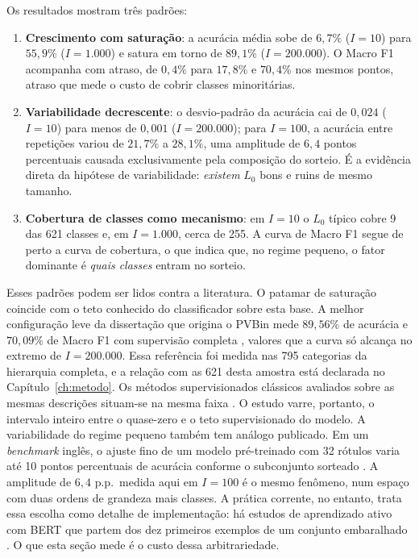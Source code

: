 Os resultados mostram três padrões:

\begin{enumerate}
  \item \textbf{Crescimento com saturação}: a acurácia média sobe de $6{,}7\%$
  ($I=10$) para $55{,}9\%$ ($I=1.000$) e satura em torno de $89{,}1\%$
  ($I=200.000$). O Macro F1 acompanha com atraso, de $0{,}4\%$ para $17{,}8\%$
  e $70{,}4\%$ nos mesmos pontos, atraso que mede o custo de cobrir classes
  minoritárias.
  \item \textbf{Variabilidade decrescente}: o desvio-padrão da acurácia cai de
  $0{,}024$ ($I=10$) para menos de $0{,}001$ ($I=200.000$); para $I=100$, a
  acurácia entre repetições variou de $21{,}7\%$ a $28{,}1\%$, uma amplitude
  de $6{,}4$ pontos percentuais causada exclusivamente pela composição do
  sorteio. É a evidência direta da hipótese de variabilidade: \emph{existem}
  $L_0$ bons e ruins de mesmo tamanho.
  \item \textbf{Cobertura de classes como mecanismo}: em $I=10$ o $L_0$ típico
  cobre 9 das 621 classes e, em $I=1.000$, cerca de 255. A curva de Macro F1
  segue de perto a curva de cobertura, o que indica que, no regime pequeno, o
  fator dominante é \emph{quais classes} entram no sorteio.
\end{enumerate}

Esses padrões podem ser lidos contra a literatura. O patamar
de saturação coincide com o teto conhecido do classificador sobre esta base. A
melhor configuração leve da dissertação que origina o PVBin mede $89{,}56\%$
de acurácia e $70{,}09\%$ de Macro F1 com supervisão completa
\citep{Daru2024Dissertacao}, valores que a curva só alcança no extremo de
$I=200.000$. Essa referência foi medida nas 795 categorias da hierarquia
completa, e a relação com as 621 desta amostra está declarada no
Capítulo~\ref{ch:metodo}. Os métodos supervisionados clássicos avaliados
sobre as mesmas descrições situam-se na mesma faixa \citep{Daru2022}. O estudo varre,
portanto, o intervalo inteiro entre o quase-zero e o teto supervisionado do
modelo. A variabilidade do regime pequeno também tem análogo publicado. Em
um \textit{benchmark} inglês, o ajuste fino de um modelo pré-treinado com 32
rótulos varia até 10 pontos percentuais de acurácia conforme o subconjunto
sorteado \citep{Yu2023Patron}. A amplitude de $6{,}4$ p.p.\ medida aqui em
$I=100$ é o mesmo fenômeno, num espaço com duas ordens de grandeza mais
classes. A prática corrente, no entanto, trata essa escolha como detalhe de
implementação: há estudos de aprendizado ativo com BERT que partem dos dez
primeiros exemplos de um conjunto embaralhado \citep{Griesshaber2020}. O que
esta seção mede é o custo dessa arbitrariedade.


